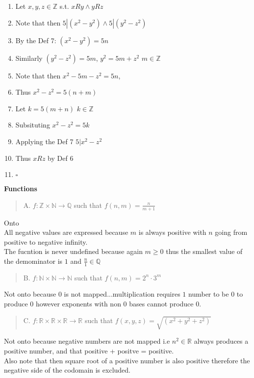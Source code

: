 \documentclass[12pt]{article}
\begin{document}
\begin{enumerate}
  \begin{enumerate}
  \item Let $x,y,z\in\mathbb{Z}$ s.t. $xRy \wedge yRz$
  \item Note that then $5|(x^2-y^2) \wedge 5|(y^2-z^2)$
  \item By the Def 7: $(x^2-y^2)=5n$
  \item Similarly $(y^2-z^2)=5m$, $y^2=5m+z^2$ $m\in\mathbb{Z}$
  \item Note that then $x^2-5m-z^2=5n$, 
  \item Thus $x^2-z^2=5(n+m)$
  \item Let $k=5(m+n)$ $k\in\mathbb{Z}$
  \item Subsituting $x^2-z^2=5k$
  \item Applying the Def 7 $5|x^2-z^2$
  \item Thus $xRz$ by Def 6
  \item $\square$
  \end{enumerate}

\item \textbf{Functions}

  \begin{quote}
  \item A. $f: \mathbb{Z} \times \mathbb{N} \rightarrow \mathbb{Q}$
    such that $f(n,m) = \frac{n}{m+1}$
  \end{quote}

  Onto\\
  All negative values are expressed because $m$ is always positive with $n$ going from positive to negative infinity.\\
  The fucntion is never undefined because again $m \geq 0$ thus the
  smallest value of the demominator is $1$ and $\frac{n}{1} \in \mathbb{Q}$

  \begin{quote}
  \item B. $f: \mathbb{N} \times \mathbb{N} \rightarrow \mathbb{N}$
    such that $f(n,m)=2^{n} \cdot 3^{m}$
  \end{quote}

  Not onto because $0$ is not mapped...multiplication requires $1$
  number to be $0$ to produce $0$ however exponents with non $0$ bases
  cannot produce $0$.

  \begin{quote}
  \item C. $f: \mathbb{R} \times \mathbb{R} \times \mathbb{R}
    \rightarrow \mathbb{R}$ such that $f(x,y,z) =
    \sqrt{(x^2+y^2+z^2)}$
  \end{quote}

  Not onto because negative numbers are not mapped i.e $n^2 \in \mathbb{R}$ always produces a positive number, and that positive + positve = positive.\\
  Also note that then square root of a positive number is also positive therefore the negative side of the codomain is excluded.

\end{enumerate}
\end{document}
